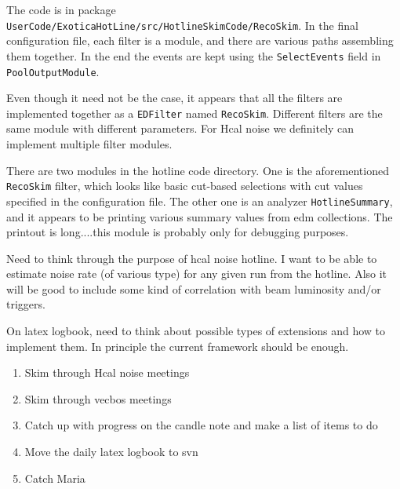 
The code is in package
\texttt{UserCode/ExoticaHotLine/src/HotlineSkimCode/RecoSkim}.
In the final configuration file, each filter is a module, and
there are various paths assembling them together.  In the end
the events are kept using the \texttt{SelectEvents} field in
\texttt{PoolOutputModule}.

Even though it need not be the case, it appears that all the
filters are implemented together as a \texttt{EDFilter} named \texttt{RecoSkim}.
Different filters are the same module with different parameters.
For Hcal noise we definitely can implement multiple filter modules.

There are two modules in the hotline code directory.  One is the
aforementioned \texttt{RecoSkim} filter, which looks like basic cut-based
selections with cut values specified in the configuration file.
The other one is an analyzer \texttt{HotlineSummary}, and it appears to
be printing various summary values from edm collections.
The printout is long....this module is probably only for debugging purposes.



Need to think through the purpose of hcal noise hotline.
I want to be able to estimate noise rate (of various type)
for any given run from the hotline.  Also it will be good to
include some kind of correlation with beam luminosity and/or
triggers.

On latex logbook, need to think about possible types of extensions
and how to implement them.  In principle the current framework
should be enough.



\begin{enumerate}
\item Skim through Hcal noise meetings
\item Skim through vecbos meetings
\item Catch up with progress on the candle note and make a list of items to do
\item Move the daily latex logbook to svn
\item Catch Maria
\end{enumerate}


